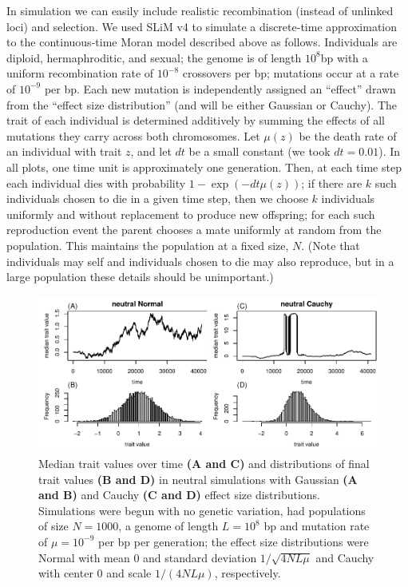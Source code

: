 \documentclass{article}
\newcommand{\1}{\mathbbm{1}}
\theoremstyle{remark}
\theoremstyle{definition}
\begin{document}
In simulation we can easily include realistic recombination (instead of unlinked loci) and selection.
We used SLiM v4 \citep{haller2022slim4}
to simulate a discrete-time approximation to the continuous-time Moran model described above
as follows.
Individuals are diploid, hermaphroditic, and sexual;
the genome is of length $10^8$bp with a uniform recombination rate of $10^{-8}$ crossovers per bp;
mutations occur at a rate of $10^{-9}$ per bp.
Each new mutation is independently assigned an ``effect''
drawn from the ``effect size distribution'' (and will be either Gaussian or Cauchy).
The trait of each individual is determined additively
by summing the effects of all mutations they carry across both chromosomes.
Let $\mu(z)$ be the death rate of an individual with trait $z$,
and let $dt$ be a small constant (we took $dt=0.01$).
In all plots, one time unit is approximately one generation.
Then, at each time step
each individual dies with probability $1 - \exp(-dt \mu(z))$;
if there are $k$ such individuals chosen to die in a given time step,
then we choose $k$ individuals uniformly and without replacement
to produce new offspring;
for each such reproduction event the parent chooses a mate uniformly at random from the population.
This maintains the population at a fixed size, $N$.
(Note that individuals may self and individuals chosen to die may also reproduce,
but in a large population these details should be unimportant.)

\begin{figure}
    \begin{center}
        \includegraphics{sims/neutral_trait_traces}
    \end{center}
    \caption{
        Median trait values over time \textbf{(A and C)}
        and distributions of final trait values \textbf{(B and D)}
        in neutral simulations
        with Gaussian \textbf{(A and B)} and Cauchy \textbf{(C and D)}
        effect size distributions.
        Simulations were begun with no genetic variation,
        had populations of size $N=1000$,
        a genome of length $L=10^8$ bp and mutation rate of $\mu=10^{-9}$ per bp per generation;
        the effect size distributions were
        Normal with mean 0 and standard deviation $1/\sqrt{4NL\mu}$
        and Cauchy with center 0 and scale $1/(4NL\mu)$, respectively.
        \label{fig:trait_distrns}
    }
\end{figure}
\end{document}
